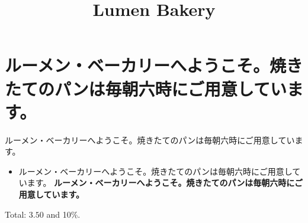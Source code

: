 \documentclass{article}
\title{Lumen Bakery}
\begin{document}
\maketitle
\section{ルーメン・ベーカリーへようこそ。焼きたてのパンは毎朝六時にご用意しています。}
ルーメン・ベーカリーへようこそ。焼きたてのパンは毎朝六時にご用意しています。

\begin{itemize}
\item ルーメン・ベーカリーへようこそ。焼きたてのパンは毎朝六時にご用意しています。 \textbf{ルーメン・ベーカリーへようこそ。焼きたてのパンは毎朝六時にご用意しています。}
\end{itemize}
Total: $3.50$ and 10\%.
\end{document}
